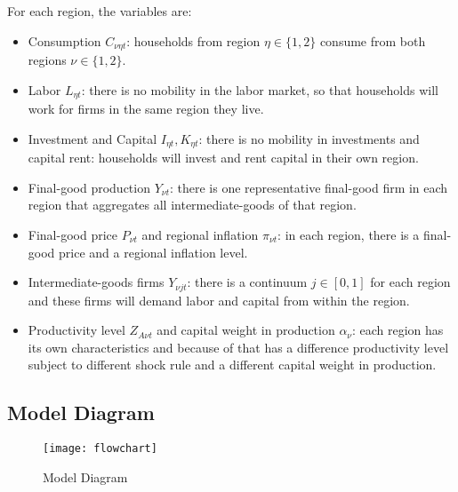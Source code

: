 \documentclass[
thesis.tex
]{subfiles}
\begin{document}
	For each region, the variables are:

\begin{itemize}
	\item Consumption \(C_{\nu\eta t}\): households from region $\eta \in \{1,2\}$ consume from both regions $\nu \in \{1,2\}$.
	
	\item Labor \(L_{\eta t}\): there is no mobility in the labor market, so that households will work for firms in the same region they live.
	
	\item Investment and Capital \(I_{\eta t}, K_{\eta t}\): there is no mobility in investments and capital rent: households will invest and rent capital in their own region.
	
	\item Final-good production \(Y_{\nu t}\): there is one representative final-good firm in each region that aggregates all intermediate-goods of that region.
	
	\item Final-good price \(P_{\nu t}\) and regional inflation \(\pi_{\nu t}\): in each region, there is a final-good price and a regional inflation level.
	
	\item Intermediate-goods firms \(Y_{\nu jt}\): there is a continuum $j \in [0,1]$ for each region and these firms will demand labor and capital from within the region.
	
	\item Productivity level \(Z_{A\nu t}\) and capital weight in production $\alpha_{\nu}$: each region has its own characteristics and because of that has a difference productivity level subject to different shock rule and a different capital weight in production.
	
\end{itemize}


\subsection*{Model Diagram}

\begin{figure}[h!]
	\centering
	\texttt{[image: flowchart]}
	\caption{Model Diagram}
	\label{fig:model-diagram}
\end{figure}
\end{document}
